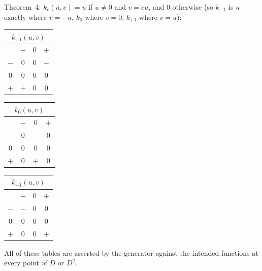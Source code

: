\documentclass[10pt,a4paper]{article}
\newcommand{\D}{D}\newcommand{\Z}{\mathcal Z}\newcommand{\SYN}{\mathsf{SYN}}\newcommand{\DIF}{\mathsf{DIF}}\newcommand{\OR}{\mathsf{OR}}\newcommand{\XOR}{\mathsf{XOR}}\newcommand{\AND}{\mathsf{AND}}\newcommand{\NOT}{\mathsf{NOT}}\newcommand{\ANT}{\mathsf{ANT}}\newcommand{\MAX}{\mathsf{MAX}}\newcommand{\MIN}{\mathsf{MIN}}\newcommand{\MAG}{\mathsf{MAG}}\newcommand{\chai}{Chai}\newcommand{\Fone}{\mathcal F_1}\newcommand{\Ftwo}{\mathcal F_2}\usepackage{tikz}\usetikzlibrary{arrows.meta,positioning}\newcommand{\yang}{\rule{0.8em}{0.18ex}}\newcommand{\yin}{\rule{0.25em}{0.18ex}\hspace{0.3em}\rule{0.25em}{0.18ex}}\newcommand{\tri}[3]{\raisebox{-0.01ex}{\shortstack[c]{#1\\[-0.3ex]#2\\[-0.3ex]#3}}}\newcommand{\iv}[1]{[\![#1]\!]}
\begin{document}
Theorem~4: $k_c(u,v)=u$ if $u\neq0$ and $v=cu$, and $0$ otherwise (so $k_{-1}$ is $u$ exactly where $v=-u$, $k_0$ where $v=0$, $k_{+1}$ where $v=u$):
\begin{center}\begin{tabular}{c|ccc}\multicolumn{4}{c}{$k_{-1}(u,v)$}\\\hline &$-$&$0$&$+$\\\hline $-$&$0$&$0$&$-$\\$0$&$0$&$0$&$0$\\$+$&$+$&$0$&$0$\\\end{tabular}\quad\begin{tabular}{c|ccc}\multicolumn{4}{c}{$k_{0}(u,v)$}\\\hline &$-$&$0$&$+$\\\hline $-$&$0$&$-$&$0$\\$0$&$0$&$0$&$0$\\$+$&$0$&$+$&$0$\\\end{tabular}\quad\begin{tabular}{c|ccc}\multicolumn{4}{c}{$k_{+1}(u,v)$}\\\hline &$-$&$0$&$+$\\\hline $-$&$-$&$0$&$0$\\$0$&$0$&$0$&$0$\\$+$&$0$&$0$&$+$\\\end{tabular}\end{center}
All of these tables are asserted by the generator against the intended functions at every point of $\D$ or $\D^2$.
\end{document}

